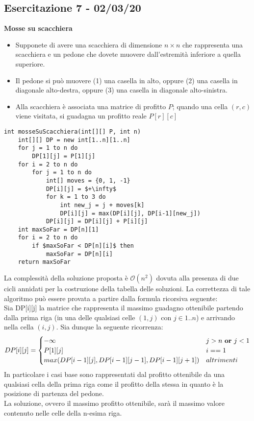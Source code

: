 \documentclass[../cheatSheetAlgoritmi.tex]{subfiles}
\begin{document}
\subsection{Esercitazione 7 - 02/03/20}
\textbf{Mosse su scacchiera}
\begin{itemize}
	\item Supponete di avere una scacchiera di dimensione $n \times n$ che rappresenta una scacchiera e un pedone che dovete muovere dall'estremità inferiore a quella superiore.
	\item Il pedone si può muovere (1) una casella in alto, oppure (2) una casella in diagonale alto-destra, oppure (3) una casella in diagonale alto-sinistra.
	\item Alla scacchiera è associata una matrice di profitto $P$; quando una cella $(r, c)$ viene visitata, si guadagna un profitto reale $P[r][c]$
\end{itemize}
\begin{lstlisting}[caption=Mosse su scacchiera]
int mosseSuScacchiera(int[][] P, int n)
    int[][] DP = new int[1..n][1..n]
    for j = 1 to n do
        DP[1][j] = P[1][j]
    for i = 2 to n do
        for j = 1 to n do
            int[] moves = {0, 1, -1}
            DP[i][j] = $+\infty$
            for k = 1 to 3 do
                int new_j = j + moves[k]
                DP[i][j] = max(DP[i][j], DP[i-1][new_j])
            DP[i][j] = DP[i][j] + P[i][j]
    int maxSoFar = DP[n][1]
    for i = 2 to n do
        if $maxSoFar < DP[n][i]$ then
            maxSoFar = DP[n][i]
    return maxSoFar
\end{lstlisting}
La complessità della soluzione proposta è $\mathcal{O}(n^2)$ dovuta alla presenza di due cicli annidati per la costruzione della tabella delle soluzioni. La correttezza di tale algoritmo può essere provata a partire dalla formula ricorsiva seguente: \\
Sia DP[i][j] la matrice che rappresenta il massimo guadagno ottenibile partendo dalla prima riga (in una delle qualsiasi celle $(1, j)$ con $j \in {1..n}$) e arrivando nella cella $(i, j)$. Sia dunque la seguente ricorrenza:
\begin{equation*}
  	DP[i][j] =\begin{cases}
        -\infty & \text{$j > n$ \textbf{or} $j < 1$} \\
    	P[1][j] & \text{$i == 1$}\\
    	max(DP[i-1][j], DP[i-1][j-1], DP[i-1][j+1]) & \text{$altrimenti$}
  	\end{cases}
\end{equation*}
In particolare i casi base sono rappresentati dal profitto ottenibile da una qualsiasi cella della prima riga come il profitto della stessa in quanto è la posizione di partenza del pedone.\\
La soluzione, ovvero il massimo profitto ottenibile, sarà il massimo valore contenuto nelle celle della n-esima riga.
\end{document}
